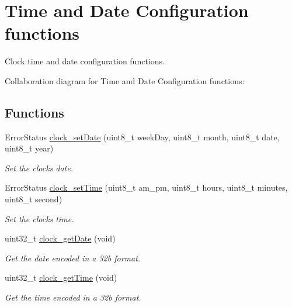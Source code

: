 \hypertarget{group___clock___time___date}{}\section{Time and Date Configuration functions}
\label{group___clock___time___date}


Clock time and date configuration functions.  


Collaboration diagram for Time and Date Configuration functions\+:
\subsection*{Functions}
\begin{DoxyCompactItemize}
\item 
Error\+Status \hyperlink{group___clock___time___date_gaf16498fa2702bfda6b89a3335ccc7ca6}{clock\+\_\+set\+Date} (uint8\+\_\+t week\+Day, uint8\+\_\+t month, uint8\+\_\+t date, uint8\+\_\+t year)
\begin{DoxyCompactList}\small\item\em Set the clock\textquotesingle{}s date. \end{DoxyCompactList}\item 
Error\+Status \hyperlink{group___clock___time___date_ga11404197d58ddf6b46230bcde4282ef2}{clock\+\_\+set\+Time} (uint8\+\_\+t am\+\_\+pm, uint8\+\_\+t hours, uint8\+\_\+t minutes, uint8\+\_\+t second)
\begin{DoxyCompactList}\small\item\em Set the clock\textquotesingle{}s time. \end{DoxyCompactList}\item 
uint32\+\_\+t \hyperlink{group___clock___time___date_gabb4d72928cb3d131d40067fb141003aa}{clock\+\_\+get\+Date} (void)
\begin{DoxyCompactList}\small\item\em Get the date encoded in a 32b format. \end{DoxyCompactList}\item 
uint32\+\_\+t \hyperlink{group___clock___time___date_ga03ae6948083c259f6edc0b146f40dc62}{clock\+\_\+get\+Time} (void)
\begin{DoxyCompactList}\small\item\em Get the time encoded in a 32b format. \end{DoxyCompactList}\end{DoxyCompactItemize}



